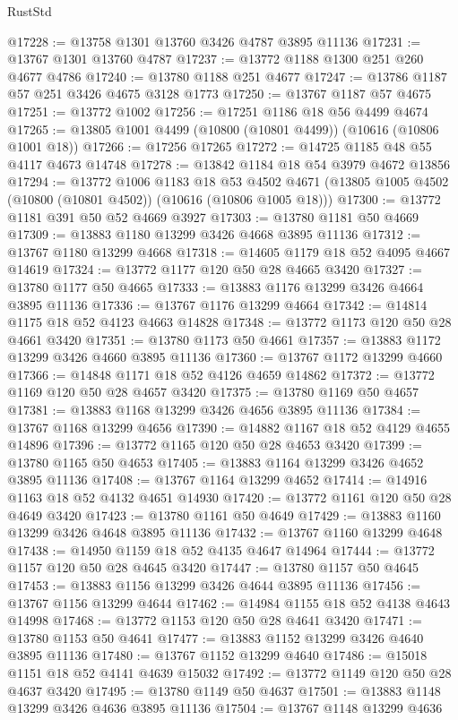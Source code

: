 \begin{lexlean}{RustStd}
\begin{coremodule}
@17228 := @13758 @1301 @13760 @3426 @4787 @3895 @11136
@17231 := @13767 @1301 @13760 @4787
@17237 := @13772 @1188 @1300 @251 @260 @4677 @4786
@17240 := @13780 @1188 @251 @4677
@17247 := @13786 @1187 @57 @251 @3426 @4675 @3128 @1773
@17250 := @13767 @1187 @57 @4675
@17251 := @13772 @1002
@17256 := @17251 @1186 @18 @56 @4499 @4674
@17265 := @13805 @1001 @4499 (@10800 (@10801 @4499)) (@10616 (@10806 @1001 @18))
@17266 := @17256 @17265
@17272 := @14725 @1185 @48 @55 @4117 @4673 @14748
@17278 := @13842 @1184 @18 @54 @3979 @4672 @13856
@17294 := @13772
    @1006
    @1183
    @18
    @53
    @4502
    @4671
    (@13805 @1005 @4502 (@10800 (@10801 @4502)) (@10616 (@10806 @1005 @18)))
@17300 := @13772 @1181 @391 @50 @52 @4669 @3927
@17303 := @13780 @1181 @50 @4669
@17309 := @13883 @1180 @13299 @3426 @4668 @3895 @11136
@17312 := @13767 @1180 @13299 @4668
@17318 := @14605 @1179 @18 @52 @4095 @4667 @14619
@17324 := @13772 @1177 @120 @50 @28 @4665 @3420
@17327 := @13780 @1177 @50 @4665
@17333 := @13883 @1176 @13299 @3426 @4664 @3895 @11136
@17336 := @13767 @1176 @13299 @4664
@17342 := @14814 @1175 @18 @52 @4123 @4663 @14828
@17348 := @13772 @1173 @120 @50 @28 @4661 @3420
@17351 := @13780 @1173 @50 @4661
@17357 := @13883 @1172 @13299 @3426 @4660 @3895 @11136
@17360 := @13767 @1172 @13299 @4660
@17366 := @14848 @1171 @18 @52 @4126 @4659 @14862
@17372 := @13772 @1169 @120 @50 @28 @4657 @3420
@17375 := @13780 @1169 @50 @4657
@17381 := @13883 @1168 @13299 @3426 @4656 @3895 @11136
@17384 := @13767 @1168 @13299 @4656
@17390 := @14882 @1167 @18 @52 @4129 @4655 @14896
@17396 := @13772 @1165 @120 @50 @28 @4653 @3420
@17399 := @13780 @1165 @50 @4653
@17405 := @13883 @1164 @13299 @3426 @4652 @3895 @11136
@17408 := @13767 @1164 @13299 @4652
@17414 := @14916 @1163 @18 @52 @4132 @4651 @14930
@17420 := @13772 @1161 @120 @50 @28 @4649 @3420
@17423 := @13780 @1161 @50 @4649
@17429 := @13883 @1160 @13299 @3426 @4648 @3895 @11136
@17432 := @13767 @1160 @13299 @4648
@17438 := @14950 @1159 @18 @52 @4135 @4647 @14964
@17444 := @13772 @1157 @120 @50 @28 @4645 @3420
@17447 := @13780 @1157 @50 @4645
@17453 := @13883 @1156 @13299 @3426 @4644 @3895 @11136
@17456 := @13767 @1156 @13299 @4644
@17462 := @14984 @1155 @18 @52 @4138 @4643 @14998
@17468 := @13772 @1153 @120 @50 @28 @4641 @3420
@17471 := @13780 @1153 @50 @4641
@17477 := @13883 @1152 @13299 @3426 @4640 @3895 @11136
@17480 := @13767 @1152 @13299 @4640
@17486 := @15018 @1151 @18 @52 @4141 @4639 @15032
@17492 := @13772 @1149 @120 @50 @28 @4637 @3420
@17495 := @13780 @1149 @50 @4637
@17501 := @13883 @1148 @13299 @3426 @4636 @3895 @11136
@17504 := @13767 @1148 @13299 @4636

\end{coremodule}
\end{lexlean}

